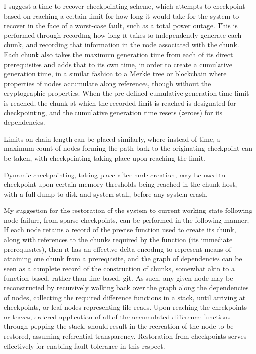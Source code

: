 I suggest a time-to-recover checkpointing scheme, which attempts to checkpoint based on reaching a certain limit for how long it would take for the system to recover in the face of a worst-case fault, such as a total power outage.
This is performed through recording how long it takes to independently generate each chunk, and recording that information in the node associated with the chunk.
Each chunk also takes the maximum generation time from each of its direct prerequisites and adds that to its own time, in order to create a cumulative generation time, in a similar fashion to a Merkle tree or blockchain where properties of nodes accumulate along references, though without the cryptographic properties\cites{merkle1988tree,nakamoto2008bitcoin}.
When the pre-defined cumulative generation time limit is reached, the chunk at which the recorded limit is reached is designated for checkpointing, and the cumulative generation time resets (zeroes) for its dependencies.

Limits on chain length can be placed similarly, where instead of time, a maximum count of nodes forming the path back to the originating checkpoint can be taken, with checkpointing taking place upon reaching the limit.

Dynamic checkpointing, taking place after node creation, may be used to checkpoint upon certain memory thresholds being reached in the chunk host, with a full dump to disk and system stall, before any system crash.

My suggestion for the restoration of the system to current working state following node failure, from sparse checkpoints, can be performed in the following manner; If each node retains a record of the precise function used to create its chunk, along with references to the chunks required by the function (its immediate prerequisites), then it has an effective delta encoding to represent means of attaining one chunk from a prerequisite, and the graph of dependencies can be seen as a complete record of the construction of chunks, somewhat akin to a function-based, rather than line-based, git\cite{chacon2014progit}.
As such, any given node may be reconstructed by recursively walking back over the graph along the dependencies of nodes, collecting the required difference functions in a stack, until arriving at checkpoints, or leaf nodes representing file reads.
Upon reaching the checkpoints or leaves, ordered application of all of the accumulated difference functions through popping the stack, should result in the recreation of the node to be restored, assuming referential transparency.
Restoration from checkpoints serves effectively for enabling fault-tolerance in this respect.

